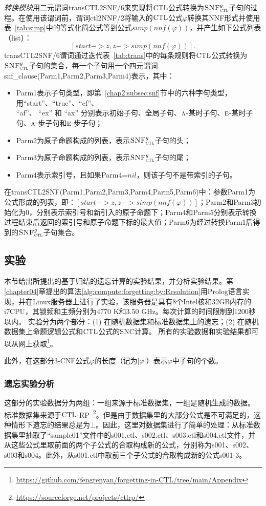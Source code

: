 {\em 转换模块}用二元谓词transCTL2SNF/6来实现将$\textrm{CTL}$公式转换为${\textsc{SNF}_{\textsc{ctl}}^g}$子句的过程。在使用该谓词前，谓词ctl2NNF/2将输入的$\textrm{CTL}$公式$\varphi$转换其NNF形式并使用表~\ref{tab:simp}中的等式化简公式等到公式$simp(nnf(\varphi))$，并产生如下公式列表（list）：
$$[start-> z, z -> simp(nnf(\varphi))].$$
transCTL2SNF/6谓词通过迭代表~\ref{tab:trans}中的每条规则将$\textrm{CTL}$公式转换为${\textsc{SNF}_{\textsc{ctl}}^g}$子句的集合，每一个子句用一个四元谓词snf\_clause(Parm1,Parm2,Parm3,Parm4)表示，其中：
\begin{itemize}
	\item Parm1表示子句类型，即第~\ref{chap2:subsec:snf}节中的六种字句类型，用“start”、“true”、“ef”、\\“af”、 “ex” 和 “ax” 分别表示初始子句、全局子句、$\textsc{a}$-某时子句、$\textsc{e}$-某时子句、$\textsc{a}$-步子句和$\textsc{e}$-步子句；
	\item Parm2为原子命题构成的列表，表示${\textsc{SNF}_{\textsc{ctl}}^g}$子句的头；
	\item Parm3为原子命题构成的列表，表示${\textsc{SNF}_{\textsc{ctl}}^g}$子句的尾；
	\item Parm4表示索引号，且如果Parm4=$nil$，则该子句不是带索引的子句。
\end{itemize}

在transCTL2SNF(Parm1,Parm2,Parm3,Parm4,Parm5,Parm6)中：参数Parm1为公式形成的列表，即：$[start-> z, z -> simp(nnf(\varphi))]$；Parm2和Parm3初始化为0，分别表示索引号和新引入的原子命题下；Parm4和Parm5分别表示转换过程结束后返回的索引号和原子命题下标的最大值；Parm6为经过转换Parm1后得到的${\textsc{SNF}_{\textsc{ctl}}^g}$子句集合。

\subsection{实验}\label{cha5:subsec:expriment}
 本节给出所提出的基于归结的遗忘计算的实验结果，并分析实验结果。第\ref{chapter04}章提出的算法\ref{alg:compute:forgetting:by:Resolution}用Prolog语言实现，并在Linux服务器上进行了实验，该服务器是具有8个Intel核和32GB内存的i7CPU，其锁频和主频分别为4770 K和3.50 GHz。每次计算的时间限制到1200秒以内。
	实验分为两个部分：(1) 在随机数据集和标准数据集上的遗忘；(2) 在随机数据集上命题逻辑公式和$\textrm{CTL}$公式的SNC计算。
	所有的实验数据和实验结果都可以从网上获取\footnote{ \url{https://github.com/fengrenyan/forgetting-in-CTL/tree/main/Appendix}}。
	
	此外，在这部分3-CNF公式$\varphi$的长度（记为$|\varphi|$）表示$\varphi$中子句的个数。

\subsubsection{遗忘实验分析}
这部分的实验数据分为两组：一组来源于标准数据集，一组是随机生成的数据。
标准数据集来源于$\textrm{CTL}$-RP~\footnote{\url{https://sourceforge.net/projects/ctlrp/}}。但是由于数据集里的大部分公式是不可满足的，这种情形下遗忘的结果总是为$\bot$。因此，这里对数据集进行了简单的处理：从标准数据集里抽取了“sample01”文件中的s001.ctl、s002.ctl、s003.ctl和s004.ctl文件，并从这些公式里取前面的两个子公式的合取构成新的公式，分别称为s001、s002、s003和s004。此外，从s001.ctl中取前三个子公式的合取构成新的公式s001-3。

